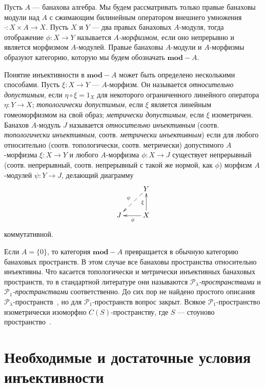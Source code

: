 \documentclass[12pt]{article}
\begin{document}
Пусть $A$ --- банахова алгебра. Мы будем рассматривать только правые банаховы
модули над $A$ с сжимающим билинейным оператором внешнего умножения
$\cdot:X\times A\to X$. Пусть $X$ и $Y$ --- два правых банаховых $A$-модуля,
тогда отображение $\phi:X\to Y$ называется \textit{$A$-морфизмом}, если оно
непрерывно и является морфизмом $A$-модулей. Правые банаховы $A$-модули и
$A$-морфизмы образуют категорию, которую мы будем обозначать $\mathbf{mod}-A$.

Понятие инъективности в $\mathbf{mod}-A$ может быть определено несколькими
способами. Пусть $\xi:X\to Y$ --- $A$-морфизм. Он называется
\textit{относительно допустимым}, если $\eta\circ \xi=1_X$ для некоторого
ограниченного линейного оператора $\eta:Y\to X$; \textit{топологически
    допустимым}, если $\xi$ является линейным гомеоморфизмом на свой образ;
\textit{метрически допустимым}, если $\xi$ изометричен. Банахов $A$-модуль $J$
называется \textit{относительно инъективным} (соотв. \textit{топологически
    инъективным}, соотв. \textit{метрически инъективным}) если для любого
относительно (соотв. топологически, соотв. метрически) допустимого $A$-морфизма
$\xi:X\to Y$ и любого $A$-морфизма $\phi:X\to J$ существует непрерывный (соотв.
непрерывный, соотв. непрерывный с такой же нормой, как  $\phi$) морфизм
$A$-модулей $\psi:Y\to J$, делающий диаграмму
$$
    \xymatrix{
    & {Y} \\
    {J} \ar@{<--}[ur]^{\psi} &{X} \ar[u]^{\xi} \ar[l]^{\phi}}  %
$$
коммутативной.

Если $A=\{0\}$, то категория $\mathbf{mod}-A$ превращается в обычную категорию
банаховых пространств. В этом случае все банаховы пространства относительно
инъективны. Что касается топологически и метрически инъективных банаховых
пространств, то в стандартной литературе они называются
\textit{$\mathcal{P}_\lambda$-пространствами} и
\textit{$\mathcal{P}_1$-пространствами} соответственно.
До сих пор не найдено простого описания
$\mathcal{P}_\lambda$-пространств~\cite[стр. vi]{AvilSepInjBanSp},
но для $\mathcal{P}_1$-пространств вопрос закрыт. Всякое
$\mathcal{P}_1$-пространство изометрически изоморфно $C(S)$-пространству, где
$S$ --- стоуново пространство~\cite{HasumExtPropCompBanSp}.


\section{Необходимые и достаточные условия
  инъективности}\label{SecionNecessaryAndSufficientConditionsForInjectivity}
\end{document}
